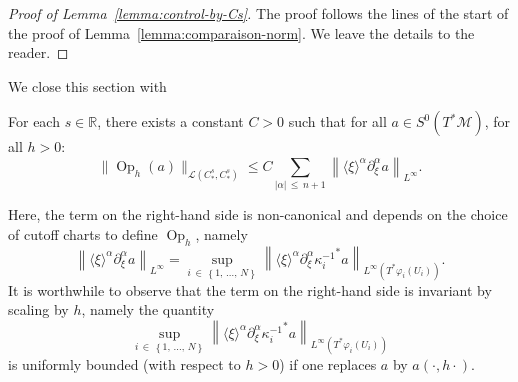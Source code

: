 \documentclass[AHL,Unicode,longabstracts,published]{cedram}
\newcommand{\R}{\mathbb{R}}
\newcommand{\mc}{\mathcal}
\newcommand{\M}{\mathcal{M}}
\DeclareMathOperator{\Op}{Op}
\begin{document}
\begin{proof}[Proof of Lemma~\ref{lemma:control-by-Cs}]
The proof follows the lines of the start of the proof of Lemma~\ref{lemma:comparaison-norm}. We leave the details to the reader.
\end{proof}



We close this section with
\begin{theo}\label{theorem:cv}
For each $s\in \R$, there exists a constant $C > 0$ such that for all $a \in S^0(T^*\M)$, for all $h>0$:
\[
\|\Op_h(a)\|_{\mc{L}(C^s_*,C^s_*)} \leq C \sum_{|\alpha|\,\leq\,n+1} \left\|\langle \xi \rangle^\alpha \partial^\alpha_\xi a\right\|_{L^\infty}.
\]
\end{theo}

Here, the term on the right-hand side is non-canonical and depends on the choice of cutoff charts to define $\Op_h$, namely
\[
\left\|\langle \xi \rangle^\alpha \partial^\alpha_\xi a\right\|_{L^\infty} = \sup_{i\,\in\,\left\{1,\,\dots,\,N\right\}} \left\|\langle \xi \rangle^\alpha \partial^\alpha_\xi {\kappa_i^{-1}}^*a\right\|_{L^\infty\left(T^* \varphi_i(U_i)\right)}.
\]
It is worthwhile to observe that the term on the right-hand side is invariant by scaling by $h$, namely the quantity
\[
\sup_{i\,\in\,\left\{1,\,\dots,\,N\right\}} \left\|\langle \xi \rangle^\alpha \partial^\alpha_\xi {\kappa_i^{-1}}^*a\right\|_{L^\infty\left(T^* \varphi_i(U_i)\right)}
\]
is uniformly bounded (with respect to $h > 0$) if one replaces $a$ by $a(\cdot,h\cdot)$.
\end{document}
